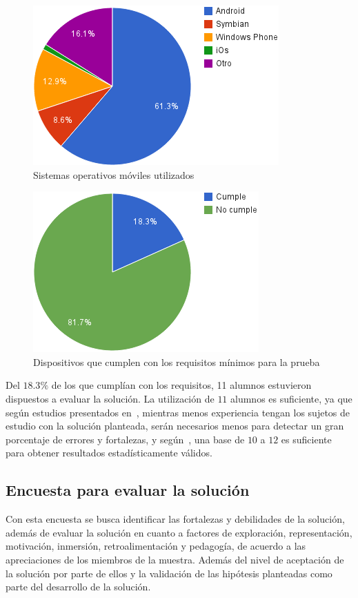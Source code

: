 \begin{figure}[H]
\centering
\includegraphics[scale=0.5]{../resultados/imagenes/ubicacion_sistemas_operativos.png}
\caption{Sistemas operativos móviles utilizados}
\label{fig:ubicacion_sistemas_operativos}
\end{figure}

\begin{figure}[H]
\centering
\includegraphics[scale=0.5]{../resultados/imagenes/ubicacion_requisitos_minimos.png}
\caption{Dispositivos que cumplen con los requisitos mínimos para la prueba}
\label{fig:ubicacion_requisitos_minimos}
\end{figure}

Del $18.3\%$ de los que cumplían con los requisitos, 11 alumnos estuvieron 
dispuestos a evaluar la solución. La utilización de $11$ alumnos es suficiente, ya que según estudios presentados
en~\cite{nielsen2000}, mientras menos experiencia tengan los sujetos de estudio
con la solución planteada, serán necesarios menos para detectar un gran
porcentaje de errores y fortalezas, y según~\cite{ritch2009}, una base de $10$ a
$12$ es suficiente para obtener resultados estadísticamente válidos.

\subsection{Encuesta para evaluar la solución}
\label{encuesta_solucion}
Con esta encuesta se busca identificar las fortalezas y debilidades de la 
solución, además de evaluar la solución en cuanto a factores de exploración, 
representación, motivación, inmersión, retroalimentación y pedagogía, de 
acuerdo a las apreciaciones de los miembros de la muestra. Además del nivel 
de aceptación de la solución por parte de ellos y la validación de las 
hipótesis planteadas como parte del desarrollo de la solución.


